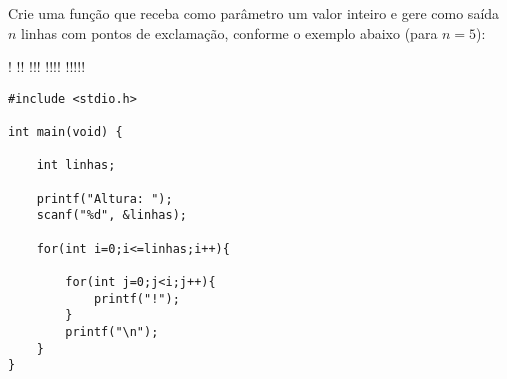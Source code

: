 
\question[10]

Crie uma função que receba como parâmetro um valor inteiro e gere como saída $n$ linhas com pontos de exclamação, conforme o exemplo abaixo (para $n = 5$):

\begin{exemplo}{}{}
!	\newline
!! \newline
!!!  \newline
!!!! \newline
!!!!!
\end{exemplo}

\begin{solution}
\begin{lstlisting}
#include <stdio.h>

int main(void) {

	int linhas;
	
	printf("Altura: ");
	scanf("%d", &linhas);
	
	for(int i=0;i<=linhas;i++){
	
		for(int j=0;j<i;j++){
			printf("!");
		}
		printf("\n");
	}
}
\end{lstlisting}
\end{solution}